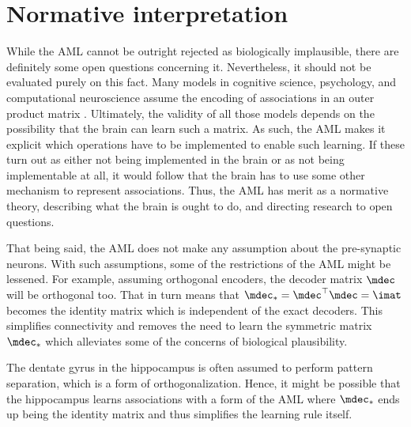 \section{Normative interpretation}
While the AML cannot be outright rejected as biologically implausible, there are definitely some open questions concerning it.
Nevertheless, it should not be evaluated purely on this fact.
Many models in cognitive science, psychology, and computational neuroscience assume the encoding of associations in an outer product matrix \parencite[e.g.,][]{kajic2017,nowak2001,Brown2000}.
Ultimately, the validity of all those models depends on the possibility that the brain can learn such a matrix.
As such, the AML makes it explicit which operations have to be implemented to enable such learning.
If these turn out as either not being implemented in the brain or as not being implementable at all, it would follow that the brain has to use some other mechanism to represent associations.
Thus, the AML has merit as a normative theory, describing what the brain is ought to do, and directing research to open questions.

That being said, the AML does not make any assumption about the pre-synaptic neurons.
With such assumptions, some of the restrictions of the AML might be lessened.
For example, assuming orthogonal encoders, the decoder matrix $\mdec$ will be orthogonal too.
That in turn means that $\mdec_* = \mdec\Tr \mdec = \imat$ becomes the identity matrix which is independent of the exact decoders.
This simplifies connectivity and removes the need to learn the symmetric matrix $\mdec_*$ which alleviates some of the concerns of biological plausibility.

The dentate gyrus in the hippocampus is often assumed to perform pattern separation, which is a form of orthogonalization.
Hence, it might be possible that the hippocampus learns associations with a form of the AML where $\mdec_*$ ends up being the identity matrix and thus simplifies the learning rule itself.


